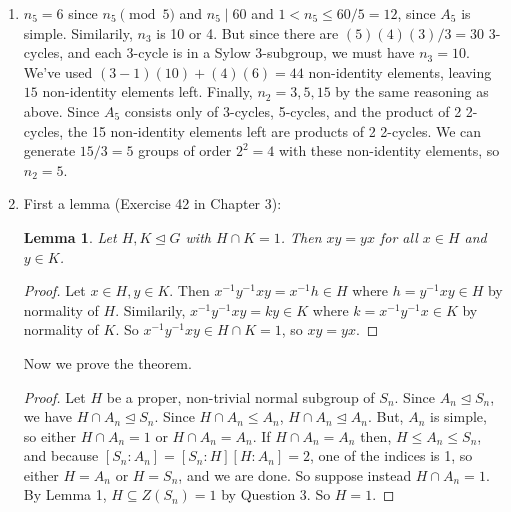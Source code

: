 \documentclass[11pt, letterpaper]{article}
\newtheorem{lemma}{Lemma}
\begin{document}
\begin{enumerate}
  \item $n_5 = 6$ since $n_5 \pmod 5$ and $n_5 \mid 60$ and $1 < n_5 \leq 60/5 = 12$, since $A_5$ is simple. Similarily, $n_3$ is 10 or 4. But since there are $(5)(4)(3)/3 = 30$ 3-cycles, and each 3-cycle is in a Sylow 3-subgroup, we must have $n_3 = 10$. We've used $(3 - 1)(10) + (4)(6) = 44$ non-identity elements, leaving $15$ non-identity elements left. Finally, $n_2 = 3, 5, 15$ by the same reasoning as above. Since $A_5$ consists only of 3-cycles, 5-cycles, and the product of 2 2-cycles, the 15 non-identity elements left are products of 2 2-cycles. We can generate $15/3 = 5$ groups of order $2^2 = 4$ with these non-identity elements, so $n_2 = 5$.
  
  \item First a lemma (Exercise 42 in Chapter 3):
  \begin{lemma}Let $H, K \trianglelefteq G$ with $H \cap K = 1$. Then $xy = yx$ for all $x \in H$ and $y \in K$.
  \end{lemma}
  \begin{proof}
    Let $x \in H, y \in K$. Then $x^{-1}y^{-1}xy = x^{-1}h \in H$ where $h = y^{-1}xy \in H$ by normality of $H$. Similarily, $x^{-1}y^{-1}xy = ky \in K$ where $k = x^{-1}y^{-1}x \in K$ by normality of $K$. So $x^{-1}y^{-1}xy \in H \cap K = 1$, so $xy = yx$. 
  \end{proof}

  Now we prove the theorem.

  \begin{proof}
    Let $H$ be a proper, non-trivial normal subgroup of $S_n$. Since $A_n \trianglelefteq S_n$, we have $H \cap A_n \trianglelefteq S_n$. Since $H \cap A_n \leq A_n$, $H \cap A_n \trianglelefteq A_n$. But, $A_n$ is simple, so either $H \cap A_n = 1$ or $H \cap A_n = A_n$. If $H \cap A_n = A_n$ then, $H \leq A_n \leq S_n$, and because $[S_n : A_n] = [S_n : H][H : A_n] = 2$, one of the indices is 1, so either $H = A_n$ or $H = S_n$, and we are done. So suppose instead $H \cap A_n = 1$. By Lemma 1, $H \subseteq Z(S_n) = 1$ by Question 3. So $H = 1$.
  \end{proof}
\end{enumerate}
\end{document}
